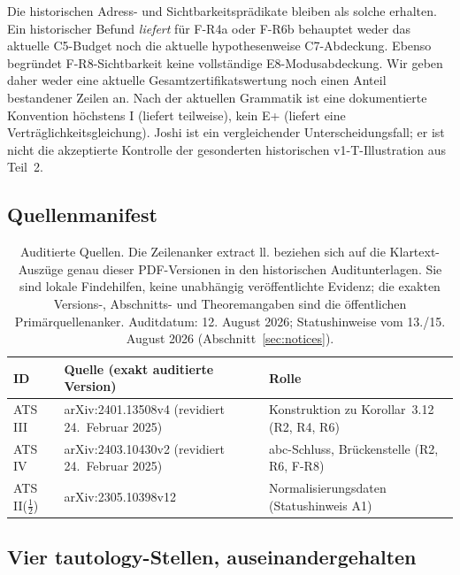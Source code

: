 \documentclass[11pt,a4paper]{article}
\begin{document}
Die historischen Adress- und Sichtbarkeitsprädikate bleiben als
solche erhalten. Ein historischer Befund \emph{liefert} für F-R4a oder
F-R6b behauptet weder das aktuelle C5-Budget noch die aktuelle
hypothesenweise C7-Abdeckung. Ebenso begründet F-R8-Sichtbarkeit
keine vollständige E8-Modusabdeckung. Wir geben daher weder eine
aktuelle Gesamtzertifikatswertung noch einen Anteil bestandener
Zeilen an. Nach der aktuellen Grammatik ist eine dokumentierte
Konvention höchstens I (liefert teilweise), kein E+ (liefert eine
Verträglichkeitsgleichung). Joshi ist ein vergleichender
Unterscheidungsfall; er ist nicht die akzeptierte Kontrolle der
gesonderten historischen v1-T-Illustration aus Teil~2.

\subsection{Quellenmanifest}\label{sec:manifest}

\begin{table}[htbp]
\centering\small
\setlength{\tabcolsep}{4pt}
\begin{tabularx}{\textwidth}{@{}l >{\raggedright\arraybackslash}X >{\raggedright\arraybackslash}p{5.5cm}@{}}
\toprule
ID & Quelle (exakt auditierte Version) & Rolle \\
\midrule
ATS III & arXiv:2401.13508v4 (revidiert 24.~Februar 2025)~\cite{joshiIII} & Konstruktion zu Korollar~3.12 (R2, R4, R6) \\
ATS IV & arXiv:2403.10430v2 (revidiert 24.~Februar 2025)~\cite{joshiIV} & abc-Schluss, Brückenstelle (R2, R6, F-R8) \\
ATS II($\tfrac12$) & arXiv:2305.10398v12~\cite{joshiIIhalf} & Normalisierungsdaten (Statushinweis A1) \\
\bottomrule
\end{tabularx}
\caption{Auditierte Quellen. Die Zeilenanker \glqq extract ll.\grqq{} beziehen sich auf
die Klartext-Auszüge genau dieser PDF-Versionen in den historischen
Auditunterlagen. Sie sind lokale Findehilfen, keine unabhängig
veröffentlichte Evidenz; die exakten Versions-, Abschnitts- und
Theoremangaben sind die öffentlichen Primärquellenanker. Auditdatum:
12. August 2026; Statushinweise vom 13./15. August 2026
(Abschnitt~\ref{sec:notices}).}
\label{tab:manifest}
\end{table}

\subsection{\texorpdfstring{Vier \glqq tautology\grqq{}-Stellen, auseinandergehalten}{Vier \textquotedbl tautology\textquotedbl -Stellen, auseinandergehalten}}\label{sec:tautology}
\end{document}

